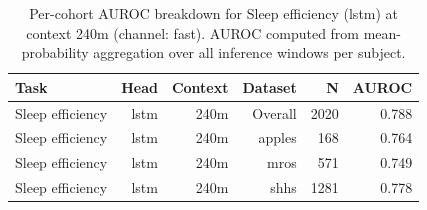\begin{table}[ht]
\centering
\caption{Per-cohort AUROC breakdown for Sleep efficiency (lstm) at context 240m (channel: fast). AUROC computed from mean-probability aggregation over all inference windows per subject.}
\label{tab:cohort_sleep_efficiency_binary_lstm_fast}
\begin{tabular}{lrrrrr}
\toprule
Task & Head & Context & Dataset & N & AUROC \\
\midrule
Sleep efficiency & lstm & 240m & Overall & 2020 & 0.788 \\
Sleep efficiency & lstm & 240m & apples & 168 & 0.764 \\
Sleep efficiency & lstm & 240m & mros & 571 & 0.749 \\
Sleep efficiency & lstm & 240m & shhs & 1281 & 0.778 \\
\bottomrule
\end{tabular}
\end{table}